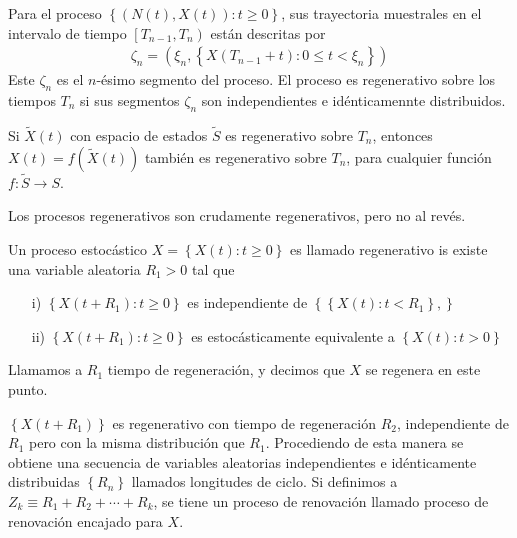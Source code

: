 \begin{Def}
Para el proceso $\left\{\left(N\left(t\right),X\left(t\right)\right):t\geq0\right\}$, sus trayectoria muestrales en el intervalo de tiempo $\left[T_{n-1},T_{n}\right)$ est\'an descritas por
\begin{eqnarray*}
\zeta_{n}=\left(\xi_{n},\left\{X\left(T_{n-1}+t\right):0\leq t<\xi_{n}\right\}\right)
\end{eqnarray*}
Este $\zeta_{n}$ es el $n$-\'esimo segmento del proceso. El proceso es regenerativo sobre los tiempos $T_{n}$ si sus segmentos $\zeta_{n}$ son independientes e id\'enticamennte distribuidos.
\end{Def}


\begin{Obs}
Si $\tilde{X}\left(t\right)$ con espacio de estados $\tilde{S}$ es regenerativo sobre $T_{n}$, entonces $X\left(t\right)=f\left(\tilde{X}\left(t\right)\right)$ tambi\'en es regenerativo sobre $T_{n}$, para cualquier funci\'on $f:\tilde{S}\rightarrow S$.
\end{Obs}

\begin{Obs}
Los procesos regenerativos son crudamente regenerativos, pero no al rev\'es.
\end{Obs}

\begin{Def}
Un proceso estoc\'astico $X=\left\{X\left(t\right):t\geq0\right\}$ es llamado regenerativo is existe una variable aleatoria $R_{1}>0$ tal que
\begin{itemize}
\item[i)] $\left\{X\left(t+R_{1}\right):t\geq0\right\}$ es independiente de $\left\{\left\{X\left(t\right):t<R_{1}\right\},\right\}$
\item[ii)] $\left\{X\left(t+R_{1}\right):t\geq0\right\}$ es estoc\'asticamente equivalente a $\left\{X\left(t\right):t>0\right\}$
\end{itemize}

Llamamos a $R_{1}$ tiempo de regeneraci\'on, y decimos que $X$ se regenera en este punto.
\end{Def}

$\left\{X\left(t+R_{1}\right)\right\}$ es regenerativo con tiempo de regeneraci\'on $R_{2}$, independiente de $R_{1}$ pero con la misma distribuci\'on que $R_{1}$. Procediendo de esta manera se obtiene una secuencia de variables aleatorias independientes e id\'enticamente distribuidas $\left\{R_{n}\right\}$ llamados longitudes de ciclo. Si definimos a $Z_{k}\equiv R_{1}+R_{2}+\cdots+R_{k}$, se tiene un proceso de renovaci\'on llamado proceso de renovaci\'on encajado para $X$.

